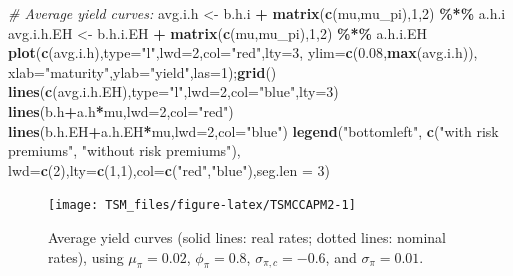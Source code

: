 \documentclass[
  12pt,
]{book}
\newenvironment{Shaded}{\begin{snugshade}}{\end{snugshade}}
\newcommand{\AttributeTok}[1]{\textcolor[rgb]{0.13,0.29,0.53}{#1}}
\newcommand{\CommentTok}[1]{\textcolor[rgb]{0.56,0.35,0.01}{\textit{#1}}}
\newcommand{\DecValTok}[1]{\textcolor[rgb]{0.00,0.00,0.81}{#1}}
\newcommand{\FloatTok}[1]{\textcolor[rgb]{0.00,0.00,0.81}{#1}}
\newcommand{\FunctionTok}[1]{\textcolor[rgb]{0.13,0.29,0.53}{\textbf{#1}}}
\newcommand{\NormalTok}[1]{#1}
\newcommand{\OtherTok}[1]{\textcolor[rgb]{0.56,0.35,0.01}{#1}}
\newcommand{\SpecialCharTok}[1]{\textcolor[rgb]{0.81,0.36,0.00}{\textbf{#1}}}
\newcommand{\StringTok}[1]{\textcolor[rgb]{0.31,0.60,0.02}{#1}}
\theoremstyle{definition}
\theoremstyle{definition}
\theoremstyle{definition}
\theoremstyle{definition}
\theoremstyle{remark}
\begin{document}
\begin{Shaded}
\begin{Highlighting}[]
\CommentTok{\# Average yield curves:}
\NormalTok{avg.i.h    }\OtherTok{\textless{}{-}}\NormalTok{ b.h.i    }\SpecialCharTok{+} \FunctionTok{matrix}\NormalTok{(}\FunctionTok{c}\NormalTok{(mu,mu\_pi),}\DecValTok{1}\NormalTok{,}\DecValTok{2}\NormalTok{) }\SpecialCharTok{\%*\%}\NormalTok{ a.h.i}
\NormalTok{avg.i.h.EH }\OtherTok{\textless{}{-}}\NormalTok{ b.h.i.EH }\SpecialCharTok{+} \FunctionTok{matrix}\NormalTok{(}\FunctionTok{c}\NormalTok{(mu,mu\_pi),}\DecValTok{1}\NormalTok{,}\DecValTok{2}\NormalTok{) }\SpecialCharTok{\%*\%}\NormalTok{ a.h.i.EH}
\FunctionTok{plot}\NormalTok{(}\FunctionTok{c}\NormalTok{(avg.i.h),}\AttributeTok{type=}\StringTok{"l"}\NormalTok{,}\AttributeTok{lwd=}\DecValTok{2}\NormalTok{,}\AttributeTok{col=}\StringTok{"red"}\NormalTok{,}\AttributeTok{lty=}\DecValTok{3}\NormalTok{,}
     \AttributeTok{ylim=}\FunctionTok{c}\NormalTok{(}\FloatTok{0.08}\NormalTok{,}\FunctionTok{max}\NormalTok{(avg.i.h)),}
     \AttributeTok{xlab=}\StringTok{"maturity"}\NormalTok{,}\AttributeTok{ylab=}\StringTok{"yield"}\NormalTok{,}\AttributeTok{las=}\DecValTok{1}\NormalTok{);}\FunctionTok{grid}\NormalTok{()}
\FunctionTok{lines}\NormalTok{(}\FunctionTok{c}\NormalTok{(avg.i.h.EH),}\AttributeTok{type=}\StringTok{"l"}\NormalTok{,}\AttributeTok{lwd=}\DecValTok{2}\NormalTok{,}\AttributeTok{col=}\StringTok{"blue"}\NormalTok{,}\AttributeTok{lty=}\DecValTok{3}\NormalTok{)}
\FunctionTok{lines}\NormalTok{(b.h}\SpecialCharTok{+}\NormalTok{a.h}\SpecialCharTok{*}\NormalTok{mu,}\AttributeTok{lwd=}\DecValTok{2}\NormalTok{,}\AttributeTok{col=}\StringTok{"red"}\NormalTok{)}
\FunctionTok{lines}\NormalTok{(b.h.EH}\SpecialCharTok{+}\NormalTok{a.h.EH}\SpecialCharTok{*}\NormalTok{mu,}\AttributeTok{lwd=}\DecValTok{2}\NormalTok{,}\AttributeTok{col=}\StringTok{"blue"}\NormalTok{)}
\FunctionTok{legend}\NormalTok{(}\StringTok{"bottomleft"}\NormalTok{,}
       \FunctionTok{c}\NormalTok{(}\StringTok{"with risk premiums"}\NormalTok{,}
         \StringTok{"without risk premiums"}\NormalTok{),}
       \AttributeTok{lwd=}\FunctionTok{c}\NormalTok{(}\DecValTok{2}\NormalTok{),}\AttributeTok{lty=}\FunctionTok{c}\NormalTok{(}\DecValTok{1}\NormalTok{,}\DecValTok{1}\NormalTok{),}\AttributeTok{col=}\FunctionTok{c}\NormalTok{(}\StringTok{"red"}\NormalTok{,}\StringTok{"blue"}\NormalTok{),}\AttributeTok{seg.len =} \DecValTok{3}\NormalTok{)}
\end{Highlighting}
\end{Shaded}

\begin{figure}
\texttt{[image: TSM\_files/figure-latex/TSMCCAPM2-1]} \caption{Average yield curves (solid lines: real rates; dotted lines: nominal rates), using $\mu_\pi = 0.02$, $\phi_\pi=0.8$, $\sigma_{\pi,c}=-0.6$, and $\sigma_\pi=0.01$.}\label{fig:TSMCCAPM2}
\end{figure}
\end{document}
